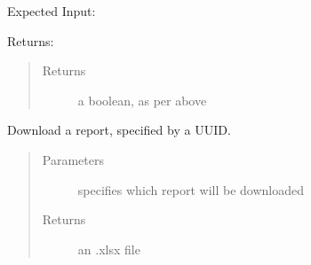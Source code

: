 \documentclass[letterpaper,10pt,english]{sphinxmanual}
\begin{document}
\begin{fulllineitems}
\begin{fulllineitems}
Expected Input:

\begin{sphinxVerbatim}[commandchars=\\\{\}]
\end{sphinxVerbatim}

Returns:

\begin{sphinxVerbatim}[commandchars=\\\{\}]
     
\end{sphinxVerbatim}
\begin{quote}\begin{description}
\item[{Returns}] \leavevmode
a boolean, as per above

\end{description}\end{quote}

\end{fulllineitems}


\begin{fulllineitems}
\label{\detokenize{apidoc/utdesign_procurement:utdesign_procurement.apigateway.ApiGateway.reportDownload}}
Download a report, specified by a UUID.
\begin{quote}\begin{description}
\item[{Parameters}] \leavevmode
{} \textendash{} specifies which report will be downloaded

\item[{Returns}] \leavevmode
an .xlsx file

\end{description}\end{quote}

\end{fulllineitems}



\end{fulllineitems}
\end{document}

